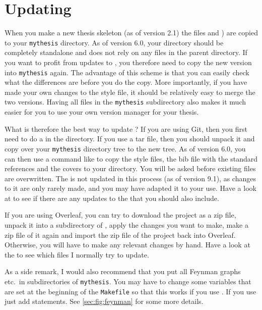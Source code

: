 \section{Updating }%
\label{sec:tips:update}

When you make a new thesis skeleton (as of version 2.1) the files
 and ) are copied
to your \texttt{mythesis} directory.
As of version 6.0, your  directory should be completely standalone
and does not rely on any files in the parent directory.
If you want to profit from updates to ,
you therefore need to copy the new version into \texttt{mythesis} again.
The advantage of this scheme is
that you can easily check what the differences are before you do the
copy. More importantly, if you have made your own changes to the style
file, it should be relatively easy to merge the two versions. Having
all files in the \texttt{mythesis} subdirectory also makes it much easier
for you to use your own version manager for your thesis.

What is therefore the best way to update ?
If you are using Git, then you first need to do a 
in the  directory.
If you use a tar file, then you should unpack it and copy over your
\texttt{mythesis} directory tree to the new  tree.
As of version 6.0, you can then use a command like
 to copy the style files,
the bib file with the standard references and the covers to your
 directory.
You will be asked before existing files are overwritten.
The  is not updated in this process (as of version 9.1),
as changes to it are only rarely made,
and you may have adapted it to your use.
Have a look at  to see if there are any updates to the  that you should also include.

If you are using Overleaf, you can try to download the project as a zip file,
unpack it into a subdirectory of ,
apply the changes you want to make,
make a zip file of it again
and import the zip file of the project back into Overleaf.
Otherwise, you will have to make any relevant changes by hand.
Have a look at the  to see which files I normally try to update.

As a side remark, I would also recommend that you put all Feynman
graphs etc.\ in subdirectories of \texttt{mythesis}. You may have to
change some variables that are set at the beginning of the
\texttt{Makefile} so that this works if you use . If
you use  just add  statements.
See \cref{sec:fig:feynman} for some more details.
